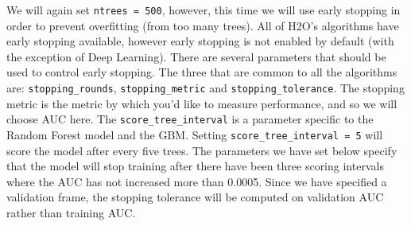 \documentclass[]{book}
\newenvironment{Shaded}{\begin{snugshade}}{\end{snugshade}}
\newcommand{\DecValTok}[1]{\textcolor[rgb]{0.00,0.00,0.81}{#1}}
\newcommand{\ErrorTok}[1]{\textcolor[rgb]{0.64,0.00,0.00}{\textbf{#1}}}
\newcommand{\NormalTok}[1]{#1}
\newcommand{\OperatorTok}[1]{\textcolor[rgb]{0.81,0.36,0.00}{\textbf{#1}}}
\newcommand{\StringTok}[1]{\textcolor[rgb]{0.31,0.60,0.02}{#1}}
\begin{document}
\begin{Shaded}
\begin{Highlighting}[]
{{{{{{{{  \OperatorTok{|}\StringTok{                                                                       }
\StringTok{  }\ErrorTok{|================}\StringTok{                                                 }\ErrorTok{|}\StringTok{  }\DecValTok{24}\NormalTok{%}
  \OperatorTok{|}\StringTok{                                                                       }
\StringTok{  }\ErrorTok{|======================}\StringTok{                                           }\ErrorTok{|}\StringTok{  }\DecValTok{34}\NormalTok{%}
  \OperatorTok{|}\StringTok{                                                                       }
\StringTok{  }\ErrorTok{|=================================}\StringTok{                                }\ErrorTok{|}\StringTok{  }\DecValTok{51}\NormalTok{%}
  \OperatorTok{|}\StringTok{                                                                       }
\StringTok{  }\ErrorTok{|=============================================}\StringTok{                    }\ErrorTok{|}\StringTok{  }\DecValTok{69}\NormalTok{%}
  \OperatorTok{|}\StringTok{                                                                       }
\StringTok{  }\ErrorTok{|=======================================================}\StringTok{          }\ErrorTok{|}\StringTok{  }\DecValTok{84}\NormalTok{%}
  \OperatorTok{|}\StringTok{                                                                       }
\StringTok{  }\ErrorTok{|================================================================}\StringTok{ }\ErrorTok{|}\StringTok{  }\DecValTok{98}\NormalTok{%}
  \OperatorTok{|}\StringTok{                                                                       }
\StringTok{  }\ErrorTok{|=================================================================|}\StringTok{ }\DecValTok{100}\NormalTok{%}
\end{Highlighting}
\end{Shaded}

We will again set \texttt{ntrees\ =\ 500}, however, this time we will use early stopping in order to
prevent overfitting (from too many trees). All of H2O's algorithms have early stopping available, however early stopping is not enabled by default (with the exception of Deep Learning).
There are several parameters that should be used to control early stopping. The three that are common to all the algorithms are: \texttt{stopping\_rounds}, \texttt{stopping\_metric} and \texttt{stopping\_tolerance}.
The stopping metric is the metric by which you'd like to measure performance, and so we will choose AUC here. The \texttt{score\_tree\_interval} is a parameter specific to the Random Forest model and the GBM.
Setting \texttt{score\_tree\_interval\ =\ 5} will score the model after every five trees. The parameters we have set below specify that the model will stop training after there have been three scoring intervals where the AUC has not increased more than 0.0005. Since we have specified a validation frame, the stopping tolerance will be computed on validation AUC rather than training AUC.
\end{document}
